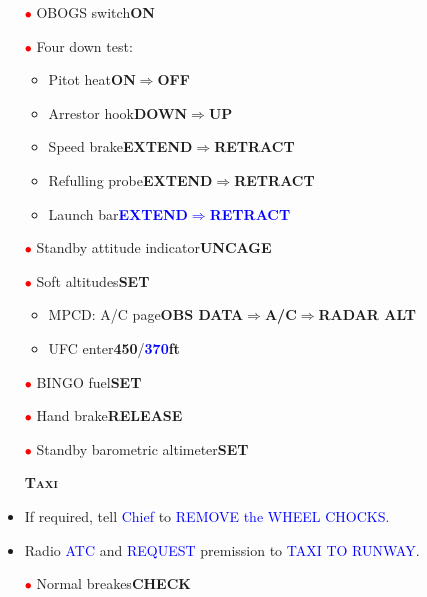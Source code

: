 \documentclass[a4paper,12pt,dvipsnames]{letter}
\newcommand{\radio}[1]{\textcolor{blue}{#1}}
\newcommand{\button}[1]{\textbf{#1}}
\newcommand{\boat}[1]{\textcolor{Blue}{\textbf{#1}}}
\newcommand{\myHead}[1]{{\LARGE\textsc{\textbf{#1}}}}
\newcommand{\ri}{\textcolor{red}{$\bullet$\;}}
\begin{document}
{\begin{itemize}
 \begin{itemize}
  \item Stabilator\dotfill\button{12\textdegree}
 \end{itemize}
 \item[\ri] OBOGS switch\dotfill\button{ON}
 \item[\ri] Four down test:
 \begin{itemize}
  \item Pitot heat\dotfill\button{ON\;$\Rightarrow$\;OFF}
  \item Arrestor hook\dotfill\button{DOWN\;$\Rightarrow$\;UP}
  \item Speed brake\dotfill\button{EXTEND\;$\Rightarrow$\;RETRACT}
  \item Refulling probe\dotfill\button{EXTEND\;$\Rightarrow$\;RETRACT}
  \item Launch bar\dotfill\boat{EXTEND\;$\Rightarrow$\;RETRACT}
 \end{itemize}
 \item[\ri] Standby attitude indicator\dotfill\button{UNCAGE}
 \item[\ri] Soft altitudes\dotfill\button{SET}
 \begin{itemize}
  \item MPCD: A/C page\dotfill\button{OBS DATA\;$\Rightarrow$\;A/C\;$\Rightarrow$\;RADAR ALT}
  \item UFC enter\dotfill\button{450}/\boat{370}\button{\;ft}
 \end{itemize}  
 \item[\ri] BINGO fuel\dotfill\button{SET} 
 \item[\ri] Hand brake\dotfill\button{RELEASE}
 \item[\ri] Standby barometric altimeter\dotfill\button{SET}
\end{itemize}
\newpage
\begin{itemize}
 \item[] \myHead{Taxi}
 \item If required, tell \radio{Chief} to \radio{REMOVE the WHEEL CHOCKS}.
 \item Radio \radio{ATC} and \radio{REQUEST} premission to \radio{TAXI TO RUNWAY}.
 \item[\ri] Normal breakes\dotfill\button{CHECK}

\end{itemize}}
\end{document}
